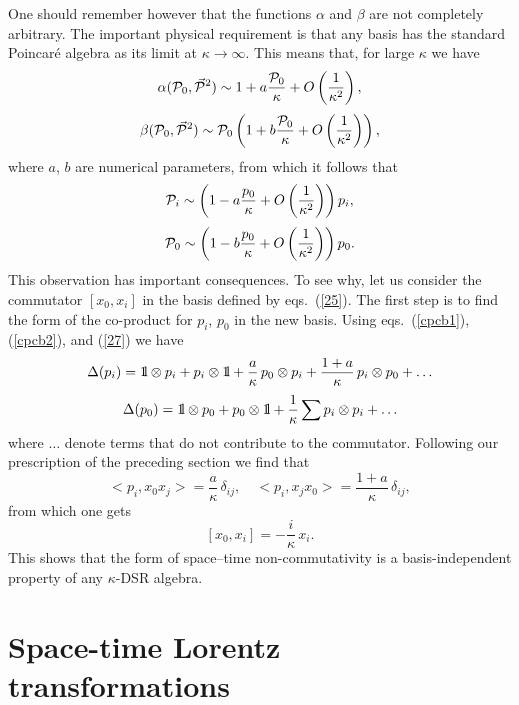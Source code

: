 \documentclass [prd,twocolumn,nofootinbib,showpacs]  {revtex4}
\def\bbbone{{\mathchoice {\rm 1\mskip-4mu l} {\rm 1\mskip-4mu l}
{\rm 1\mskip-4.5mu l} {\rm 1\mskip-5mu l}}}
\begin{document}
One should remember however that the functions $\alpha$ and
$\beta$ are not completely arbitrary.  The important physical
requirement is that any basis has the standard Poincar\'e algebra
as its limit at $\kappa\rightarrow\infty$. This means that, for
large $\kappa$ we have
$$
 \alpha({\cal P}_0, \vec{{\cal    P}}{}^2) \sim 1 + a \frac{{\cal P}_0}{\kappa} + O\left(\frac{1}{\kappa^2}\right),
$$
\begin{equation}\label{26}
\beta({\cal P}_0, \vec{{\cal    P}}{}^2) \sim {\cal P}_0\left(1 + b \frac{{\cal P}_0}{\kappa} +
O\left(\frac{1}{\kappa^2}\right)\right),
\end{equation}
where $a$, $b$ are numerical parameters, from which it follows that
$$
 {\cal P}_i \sim \left(1 - a \frac{ p_0}{\kappa} + O\left(\frac{1}{\kappa^2}\right)\right)p_i,
$$
\begin{equation}\label{27}
{\cal P}_0 \sim \left(1 - b \frac{p_0}{\kappa} + O\left(\frac{1}{\kappa^2}\right)\right)p_0.
\end{equation}
 This observation has important consequences. To see why, let us consider the commutator $[x_0, x_i]$
 in the basis defined by eqs.~(\ref{25}).  The first step is to find the form of the co-product for
 $p_i$, $p_0$ in the new basis. Using eqs.~(\ref{cpcb1}), (\ref{cpcb2}), and (\ref{27}) we have
$$
\Delta(p_i) = \bbbone \otimes p_{i} + p_{i} \otimes \bbbone +
  {\frac{a}{\kappa}}\, p_{0} \otimes p_{i} + {\frac{1+a}{\kappa}}\, p_{i} \otimes p_{0} + \ldots
$$
$$
\Delta(p_0) =\bbbone \otimes p_{0} + p_{0} \otimes \bbbone +
  \frac{1}{\kappa}\sum p_{i}\otimes p_{i}+ \ldots
$$
where $\ldots$ denote  terms that do not contribute to the
commutator. Following our prescription of the preceding  section
we find that
$$
<p_i, x_0 x_j> = \frac{a}\kappa\, \delta_{ij}, \quad <p_i,  x_jx_0>=\frac{1+a}\kappa\, \delta_{ij},
$$
from which one gets
\begin{equation}\label{28}
[x_0, x_i] = -\frac{i}\kappa\, x_i.
\end{equation}
This shows that the form of space--time non-commutativity is a basis-independent property of any $\kappa$-DSR algebra.

\section{Space-time Lorentz transformations}
\end{document}
